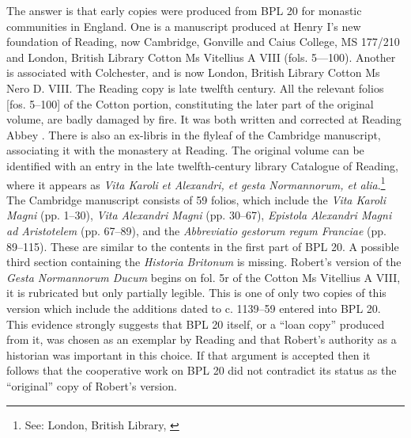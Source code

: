 \documentclass{article}
\begin{document}
The answer is that early copies were produced from BPL 20 for monastic
communities in England. One is a manuscript produced at Henry I's new
foundation of Reading, now Cambridge, Gonville and Caius College, MS
177/210 and London, British Library Cotton Ms Vitellius A VIII (fols.
5---100). Another is associated with Colchester, and is now London,
British Library Cotton Ms Nero D. VIII. The Reading copy is late twelfth
century. All the relevant folios {[}fos. 5--100{]} of the Cotton portion,
constituting the later part of the original volume, are badly damaged by
fire. It was both written and corrected at Reading Abbey \citep[154]{coates_english_1999}. There is also an ex-libris in the flyleaf of the Cambridge
manuscript, associating it with the monastery at Reading. The original
volume can be identified with an entry in the late twelfth-century
library Catalogue of Reading, where it appears as \emph{Vita Karoli}
\emph{et Alexandri, et gesta Normannorum, et alia}.\footnote{See:
  London, British Library, \cite[fol. 9v]{noauthor_reading_nodate}} The Cambridge
manuscript consists of 59 folios, which include the \emph{Vita Karoli
Magni} (pp. 1--30), \emph{Vita Alexandri Magni} (pp. 30--67),
\emph{Epistola Alexandri Magni ad Aristotelem} (pp. 67--89), and the
\emph{Abbreviatio gestorum regum Franciae} (pp. 89--115). These are
similar to the contents in the first part of BPL 20. A possible third
section containing the \emph{Historia Britonum} is missing. Robert's
version of the \emph{Gesta Normannorum Ducum} begins on fol. 5r of the
Cotton Ms Vitellius A VIII, it is rubricated but only partially legible.
This is one of only two copies of this version which include the
additions dated to c. 1139--59 entered into BPL 20. This evidence
strongly suggests that BPL 20 itself, or a ``loan copy'' produced from it,
was chosen as an exemplar by Reading and that Robert's authority as a
historian was important in this choice. If that argument is accepted
then it follows that the cooperative work on BPL 20 did not contradict
its status as the ``original'' copy of Robert's version.
\end{document}
